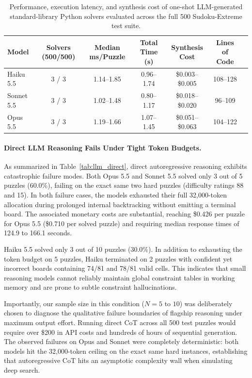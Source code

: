 \documentclass{article} %
\begin{document}
\begin{table}[t]
\caption{Performance, execution latency, and synthesis cost of one-shot LLM-generated standard-library Python solvers evaluated across the full 500 Sudoku-Extreme test suite.}
\label{tab:llm_solvers}
\begin{center}
\begin{tabular}{lcccccc}
\toprule
\textbf{Model} & \textbf{Solvers (500/500)} & \textbf{Median ms/Puzzle} & \textbf{Total Time (s)} & \textbf{Synthesis Cost} & \textbf{Lines of Code} \\
\midrule
Haiku 5.5  & 3 / 3 & 1.14--1.85 & 0.96--1.74 & \$0.003--\$0.005 & 108--128 \\
Sonnet 5.5 & 3 / 3 & 1.02--1.48 & 0.80--1.17 & \$0.018--\$0.020 & 96--109 \\
Opus 5.5   & 3 / 3 & 1.19--1.66 & 1.07--1.45 & \$0.051--\$0.063 & 104--122 \\
\bottomrule
\end{tabular}
\end{center}
\end{table}

\paragraph{Direct LLM Reasoning Fails Under Tight Token Budgets.}
As summarized in Table~\ref{tab:llm_direct}, direct autoregressive reasoning exhibits catastrophic failure modes. Both Opus 5.5 and Sonnet 5.5 solved only 3 out of 5 puzzles (60.0\%), failing on the exact same two hard puzzles (difficulty ratings 88 and 15). In both failure cases, the models exhausted their full 32,000-token allocation during prolonged internal backtracking without emitting a terminal board. The associated monetary costs are substantial, reaching \$0.426 per puzzle for Opus 5.5 (\$0.710 per solved puzzle) and requiring median response times of 124.9 to 166.1 seconds.

Haiku 5.5 solved only 3 out of 10 puzzles (30.0\%). In addition to exhausting the token budget on 5 puzzles, Haiku terminated on 2 puzzles with confident yet incorrect boards containing 74/81 and 78/81 valid cells. This indicates that small reasoning models cannot reliably maintain global constraint tables in working memory and are prone to subtle constraint hallucinations.

Importantly, our sample size in this condition ($N=5$ to $10$) was deliberately chosen to diagnose the qualitative failure boundaries of flagship reasoning under maximum output effort. Running direct CoT across all 500 test puzzles would require over \$200 in API costs and hundreds of hours of sequential generation. The observed failures on Opus and Sonnet were completely deterministic: both models hit the 32,000-token ceiling on the exact same hard instances, establishing that autoregressive CoT hits an asymptotic complexity wall when simulating deep search.
\end{document}
